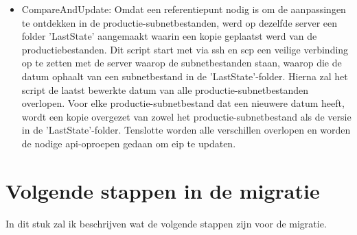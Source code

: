 {\begin{itemize}
    \item CompareAndUpdate: Omdat een referentiepunt nodig is om de aanpassingen te ontdekken in de productie-subnetbestanden, werd op dezelfde server een folder 'LastState' aangemaakt waarin een kopie geplaatst werd van de productiebestanden. Dit script start met via \acrshort{ssh} en \acrshort{scp} een veilige verbinding op te zetten met de server waarop de subnetbestanden staan, waarop die de datum ophaalt van een subnetbestand in de 'LastState'-folder. Hierna zal het script de laatst bewerkte datum van alle productie-subnetbestanden overlopen. Voor elke productie-subnetbestand dat een nieuwere datum heeft, wordt een kopie overgezet van zowel het productie-subnetbestand als de versie in de 'LastState'-folder. Tenslotte worden alle verschillen overlopen en worden de nodige \acrshort{api}-oproepen gedaan om \acrshort{eip} te updaten.
\end{itemize}
}

\section{Volgende stappen in de migratie}
In dit stuk zal ik beschrijven wat de volgende stappen zijn voor de migratie.



